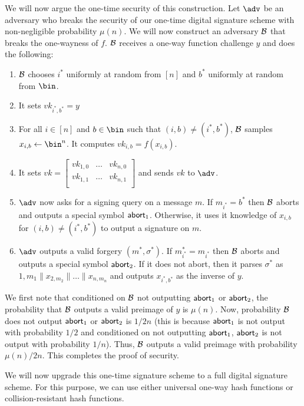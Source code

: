 We will now argue the one-time security of this construction. Let $\adv$ be an adversary who breaks the security of our one-time digital signature scheme with non-negligible probability $\mu(n)$. We will now construct an adversary $\mathcal{B}$ that breaks the one-wayness of $f$. $\mathcal{B}$ receives a one-way function challenge $y$ and does the following:
\begin{enumerate}
    \item $\mathcal{B}$ chooses $i^*$ uniformly at random from $[n]$ and $b^*$ uniformly at random from $\bin$.
    \item It sets $vk_{i^*,b^*} = y$
    \item For all $i \in [n]$ and $b \in \bin$ such that $(i,b) \neq (i^*,b^*)$, $\mathcal{B}$ samples $x_{i,b} \gets \bin^n$. It computes $vk_{i,b} = f(x_{i,b})$.
    \item It sets $vk = \left[ \begin{array}{ccc}
vk_{1,0} & \ldots& vk_{n,0} \\
vk_{1,1} & \ldots& vk_{n,1} \\
\end{array} \right]$ and sends $vk$ to $\adv$.
\item $\adv$ now asks for a signing query on a message $m$. If $m_{i^*} = b^*$ then $\mathcal{B}$ aborts and outputs a special symbol $\mathsf{abort}_1$. Otherwise, it uses it knowledge of $x_{i,b}$ for $(i,b) \neq (i^*,b^*)$ to output a signature on $m$.
\item $\adv$ outputs a valid forgery $(m^*,\sigma^*)$. If $m^*_{i^*} = m_{i^*}$ then $\mathcal{B}$ aborts and outputs a special symbol $\mathsf{abort}_2$. If it does not abort, then it parses $\sigma^*$ as ${1,m_1}\|x_{2,m_2}\| \ldots \| x_{n,m_n}$ and outputs $x_{i^*,b^*}$ as the inverse of $y$.
\end{enumerate}
We first note that conditioned on $\mathcal{B}$ not outputting $\mathsf{abort}_1$ or $\mathsf{abort}_2$, the probability that $\mathcal{B}$ outputs a valid preimage of $y$ is $\mu(n)$. Now, probability $\mathcal{B}$ does not output $\mathsf{abort}_1$ or $\mathsf{abort}_2$ is $1/2n$ (this is because $\mathsf{abort}_1$ is not output with probability $1/2$ and conditioned on not outputting $\mathsf{abort}_1$, $\mathsf{abort}_2$ is not output with probability $1/n$). Thus, $\mathcal{B}$ outputs a valid preimage with probability $\mu(n)/2n$. This completes the proof of security.

We will now upgrade this one-time signature scheme to a full digital signature scheme. For this purpose, we can use either universal one-way hash functions or collision-resistant hash functions.

